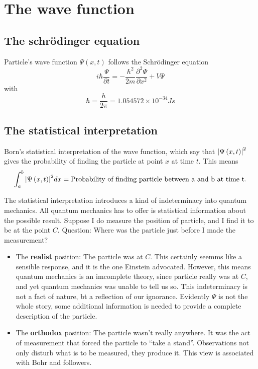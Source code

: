 \chapter{The wave function}

\section{The schr\"odinger equation}
Particle's wave function $\Psi(x,t)$ follows the Schr\"odinger equation
\begin{equation}
  \label{eq:1-1}
 i\hbar \frac{\Psi}{\partial t} = - \frac{\hbar^{2}}{2m} \frac{\partial^{2}\Psi}{\partial x^{2}} + V\Psi
\end{equation}
with
\begin{equation}
  \label{eq:1-2}
  \hbar = \frac{h}{2\pi} = 1.054572 \times 10^{-34}Js
\end{equation}

\section{The statistical interpretation}
Born's statistical interpretation of the wave function, which say that $\abs{\Psi\left(x,t\right)}^{2}$ gives the probability of finding the particle at point $x$ at time $t$.
This means
\begin{equation}
  \label{eq:1-3}
  \int_{a}^{b}\abs{\Psi\left(x,t\right)}^{2} dx = \text{Probability of finding particle between a and b at time t.}
\end{equation}

The statistical interpretation introduces a kind of indeterminacy into quantum mechanics.
All quantum mechanics has to offer is statistical information about the possible result.
Suppose I do measure the position of particle, and I find it to be at the point $C$.
Question: Where was the particle just before I made the measurement?
\begin{itemize}
  \item The \textbf{realist} position: The particle was at $C$.
        This certainly seemms like a sensible response, and it is the one Einstein advocated.
        However, this means quantum mechanics is an imcomplete theory, since particle really was at $C$, and yet quantum mechanics was unable to tell us so.
        This indeterminacy is not a fact of nature, bt a reflection of our ignorance.
        Evidently $\Psi$ is not the whole story, some additional information is needed to provide a complete description of the particle.
  \item The \textbf{orthodox} position: The particle wasn't really anywhere.
        It was the act of measurement that forced the particle to ``take a stand''.
        Observations not only disturb what is to be measured, they produce it.
        This view is associated with Bohr and followers.
\end{itemize}

